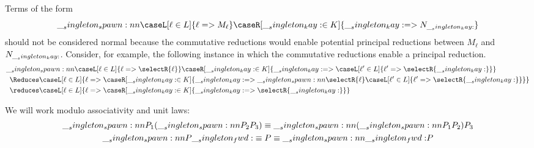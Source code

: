 \section{}

Terms of the form
\begin{equation*}
  \spawn{\caseL[\ell \in L]{\ell => M_{\ell}}}{\caseR[\kay \in K]{\kay => N_{\kay}}}
\end{equation*}
should not be considered normal because the commutative reductions would enable potential principal reductions between $M_{\ell}$ and $N_{\__singleton_kay:}$.
Consider, for example, the following instance in which the commutative reductions enable a principal reduction.
\begin{align*}
  \MoveEqLeft[0.5]
  \spawn{\caseL[\ell \in L]{\ell => \selectR{\ell}}}{\caseR[\kay \in K]{\kay => \caseL[\ell' \in L]{\ell' => \selectR{\kay}}}} \\
    &\Reduces \caseL[\ell \in L]{\ell => \caseR[\kay \in K]{\kay => \spawn{\selectR{\ell}}{\caseL[\ell' \in L]{\ell' => \selectR{\kay}}}}} \\
    &\reduces \caseL[\ell \in L]{\ell => \caseR[\kay \in K]{\kay => \selectR{\kay}}}
\end{align*}


We will work modulo associativity and unit laws:
\begin{gather*}
  \__singleton_spawn:nn {P_1} {(\__singleton_spawn:nn {P_2} {P_3})} \equiv \__singleton_spawn:nn {(\__singleton_spawn:nn {P_1} {P_2})} {P_3}
  \\
  \__singleton_spawn:nn {P} {\__singleton_fwd:} \equiv P \equiv \__singleton_spawn:nn {\__singleton_fwd:} {P}
\end{gather*}

